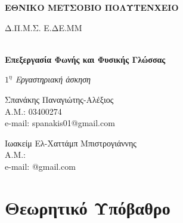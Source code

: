 \documentclass[a4paper,12pt]{article}
\begin{document}
\begin{titlepage}
    \begin{center}
        \vspace*{1cm}
        
        \Large
        \textbf{ΕΘΝΙΚΟ ΜΕΤΣΟΒΙΟ ΠΟΛΥΤΕΝΧΕΙΟ}
        
        \vspace*{0.5cm}

        \large 
        Δ.Π.Μ.Σ. Ε.ΔΕ.ΜΜ

        \large
        \textbf{\\Επεξεργασία Φωνής και Φυσικής Γλώσσας}
        
        
        
        \vspace{2.5cm}
        \small
        \textit{$1^η$ Εργαστηριακή άσκηση}        
        


    
    \end{center}
    
    
    \begin{flushright}
        \vfill
        Σπανάκης Παναγιώτης-Αλέξιος
        \\Α.Μ.: 03400274
        \\e-mail: spanakis01@gmail.com
    \end{flushright}

    \begin{flushleft}
        \vfill
        Ιωακείμ Ελ-Χαττάμπ Μπιστρογιάννης
        \\Α.Μ.: 
        \\e-mail: @gmail.com
    \end{flushleft}
    
\end{titlepage}

\newpage


\section{Θεωρητικό Υπόβαθρο}
\end{document}
